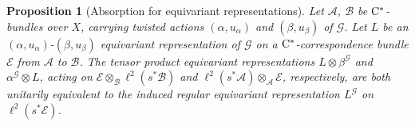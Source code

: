 \documentclass[11 pt, leqno]{amsart}
\numberwithin{equation}{section}
\theoremstyle{plain}
\newtheorem {prop}[thm] {Proposition}
\theoremstyle{definition}
\newcommand{\B}{\mathcal B}
\newcommand{\G}{\mathcal G} %
\newcommand{\EE}{\mathcal E}
\newcommand{\FF}{\mathcal F}
\newcommand{\A}{\mathcal A}
\newcommand{\cst}{\ifmmode\mathrm{C}^*\else{$\mathrm{C}^*$}\fi}
\begin{document}
 
\begin{prop}[Absorption for equivariant representations] \label{pr:RegularActionsTensor} 
Let $\A$, $\B$  be $\cst$-bundles over $X$, carrying twisted actions $(\alpha,u_\alpha)$ and $(\beta,u_\beta)$ of $\G$.
Let $L$ be an $(\alpha,u_{\alpha})$-$(\beta,u_{\beta})$ equivariant representation of $\G$ on a $\cst$-correspon\-dence bundle $\EE$ from $\A$ to $\B$. 
The tensor product equivariant representations $L \otimes \beta^\G$ and $\alpha^\G \otimes L$, acting on $\EE \otimes_{\B} \ell^2(s^*\B)$ and $\ell^2(s^*\A)\otimes_\A \EE$, respectively, are both unitarily equivalent to the induced regular equivariant representation $L^\G$ on $ \ell^2(s^*\EE)$. 
\end{prop}
\end{document}
